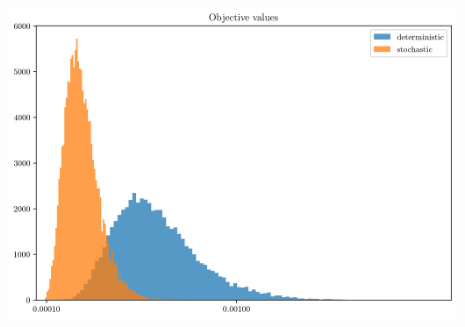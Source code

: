 \documentclass[aspectratio=1610, 10pt]{beamer}
\begin{document}
\begin{frame}
    \begin{center}
        \includegraphics[width=0.89\textwidth]{./img/histogram_comparison.png}
    \end{center}
\end{frame}
\end{document}
